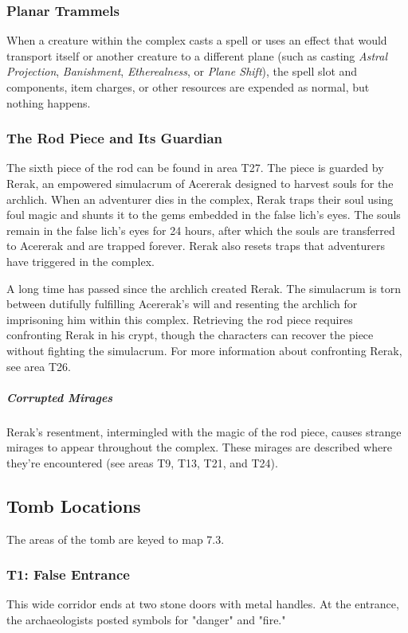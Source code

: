 \documentclass[10pt,a4paper,twoside,bg=print,twocolumn,openany,nodeprecatedcode]{dndbook}
\begin{document}
\subsubsection{Planar Trammels}
When a creature within the complex casts a spell or uses an effect that would transport itself or another creature to a different plane (such as casting \textit{Astral Projection}, \textit{Banishment}, \textit{Etherealness}, or \textit{Plane Shift}), the spell slot and components, item charges, or other resources are expended as normal, but nothing happens.

\subsubsection{The Rod Piece and Its Guardian}
The sixth piece of the rod can be found in area T27. The piece is guarded by Rerak, an empowered simulacrum of Acererak designed to harvest souls for the archlich. When an adventurer dies in the complex, Rerak traps their soul using foul magic and shunts it to the gems embedded in the false lich's eyes. The souls remain in the false lich's eyes for 24 hours, after which the souls are transferred to Acererak and are trapped forever. Rerak also resets traps that adventurers have triggered in the complex.

A long time has passed since the archlich created Rerak. The simulacrum is torn between dutifully fulfilling Acererak's will and resenting the archlich for imprisoning him within this complex. Retrieving the rod piece requires confronting Rerak in his crypt, though the characters can recover the piece without fighting the simulacrum. For more information about confronting Rerak, see area T26.

\subparagraph{Corrupted Mirages}
Rerak's resentment, intermingled with the magic of the rod piece, causes strange mirages to appear throughout the complex. These mirages are described where they're encountered (see areas T9, T13, T21, and T24).

\subsection{Tomb Locations}
The areas of the tomb are keyed to map 7.3.

\subsubsection{T1: False Entrance}
\begin{DndReadAloud}{}
This wide corridor ends at two stone doors with metal handles. At the entrance, the archaeologists posted symbols for "danger" and "fire."

\end{DndReadAloud}
\end{document}

